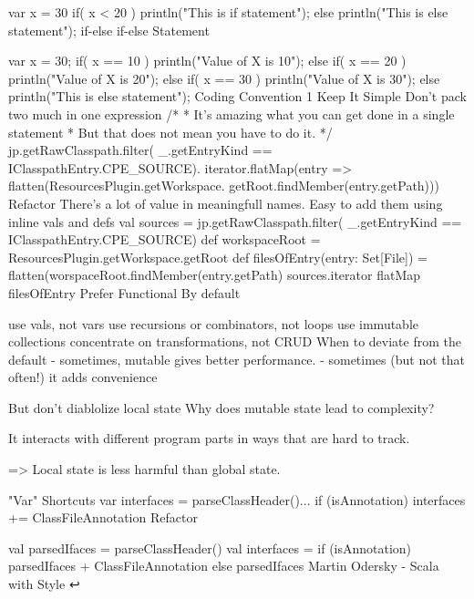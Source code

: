 var x = 30
if( x < 20 ){
  println("This is if statement");
} else {
  println("This is else statement");
}
if-else if-else Statement

 var x = 30;
if( x == 10 ){
 println("Value of X is 10");
} else if( x == 20 ){
 println("Value of X is 20");
} else if( x == 30 ){
 println("Value of X is 30");
} else{
 println("This is else statement");
}
Coding Convention 1
Keep It Simple
Don't pack two much in one expression
/*
 * It's amazing what you can get done in a single statement
 * But that does not mean you have to do it.
 */
jp.getRawClasspath.filter(
  _.getEntryKind == IClasspathEntry.CPE_SOURCE).
  iterator.flatMap(entry =>
    flatten(ResourcesPlugin.getWorkspace.
      getRoot.findMember(entry.getPath)))
Refactor
There's a lot of value in meaningfull names.
Easy to add them using inline vals and defs
val sources = jp.getRawClasspath.filter(
  _.getEntryKind == IClasspathEntry.CPE_SOURCE)
def workspaceRoot =
  ResourcesPlugin.getWorkspace.getRoot
def filesOfEntry(entry: Set[File]) =
  flatten(worspaceRoot.findMember(entry.getPath)
sources.iterator flatMap filesOfEntry
Prefer Functional
By default

use vals, not vars
use recursions or combinators, not loops
use immutable collections
concentrate on transformations, not CRUD
When to deviate from the default - sometimes, mutable gives better performance. - sometimes (but not that often!) it adds convenience

But don't diablolize local state
Why does mutable state lead to complexity?

It interacts with different program parts in ways that are hard to track.

=> Local state is less harmful than global state.

"Var" Shortcuts
var interfaces = parseClassHeader()...
if (isAnnotation) interfaces += ClassFileAnnotation
Refactor

val parsedIfaces = parseClassHeader()
val interfaces =
  if (isAnnotation) parsedIfaces + ClassFileAnnotation
  else parsedIfaces
Martin Odersky - Scala with Style ↩